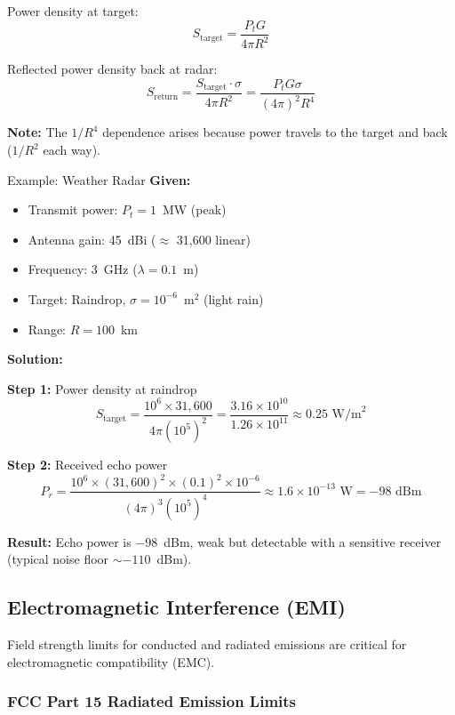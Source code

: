 Power density at target:
\begin{equation}
S_{\text{target}} = \frac{P_t G}{4\pi R^2}
\label{eq:power-density-target}
\end{equation}

Reflected power density back at radar:
\begin{equation}
S_{\text{return}} = \frac{S_{\text{target}} \cdot \sigma}{4\pi R^2} = \frac{P_t G \sigma}{(4\pi)^2 R^4}
\label{eq:power-density-return}
\end{equation}

\textbf{Note:} The $1/R^4$ dependence arises because power travels to the target and back ($1/R^2$ each way).

\begin{calloutbox}{Example: Weather Radar}
\textbf{Given:}
\begin{itemize}
\item Transmit power: $P_t = 1$~MW (peak)
\item Antenna gain: 45~dBi ($\approx$ 31,600 linear)
\item Frequency: 3~GHz ($\lambda = 0.1$~m)
\item Target: Raindrop, $\sigma = 10^{-6}$~m$^2$ (light rain)
\item Range: $R = 100$~km
\end{itemize}

\textbf{Solution:}

\textbf{Step 1:} Power density at raindrop
\[
S_{\text{target}} = \frac{10^6 \times 31{,}600}{4\pi (10^5)^2} = \frac{3.16 \times 10^{10}}{1.26 \times 10^{11}} \approx 0.25 \text{~W/m}^2
\]

\textbf{Step 2:} Received echo power
\[
P_r = \frac{10^6 \times (31{,}600)^2 \times (0.1)^2 \times 10^{-6}}{(4\pi)^3 (10^5)^4} \approx 1.6 \times 10^{-13} \text{~W} = -98 \text{~dBm}
\]

\textbf{Result:} Echo power is $-98$~dBm, weak but detectable with a sensitive receiver (typical noise floor $\sim$$-110$~dBm).
\end{calloutbox}

\subsection{Electromagnetic Interference (EMI)}

Field strength limits for conducted and radiated emissions are critical for electromagnetic compatibility (EMC).

\subsubsection{FCC Part 15 Radiated Emission Limits}

